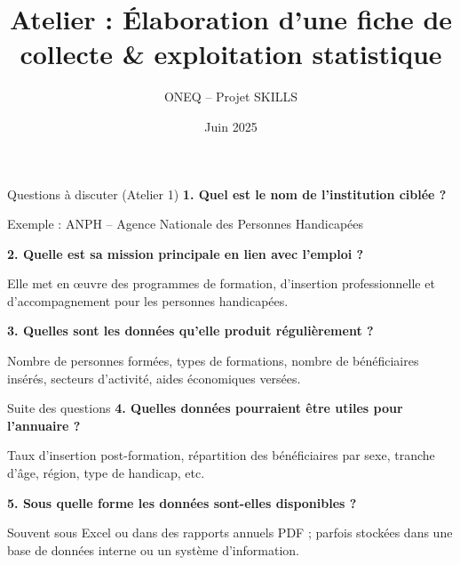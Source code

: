 \documentclass{beamer}
\title{Atelier : Élaboration d'une fiche de collecte \& exploitation statistique}
\author{ONEQ -- Projet SKILLS}
\date{Juin 2025}
\begin{document}
\frame{\titlepage}

\begin{frame}{Questions à discuter (Atelier 1)}
\pause
\textbf{1. Quel est le nom de l’institution ciblée ?}
\begin{tcolorbox}[colback=blue!5!white,colframe=blue!75!black,title=Exemple de réponse]
Exemple : ANPH – Agence Nationale des Personnes Handicapées
\end{tcolorbox}

\pause
\textbf{2. Quelle est sa mission principale en lien avec l’emploi ?}
\begin{tcolorbox}[colback=blue!5!white,colframe=blue!75!black,title=Exemple de réponse]
Elle met en œuvre des programmes de formation, d'insertion professionnelle et d’accompagnement pour les personnes handicapées.
\end{tcolorbox}

\pause
\textbf{3. Quelles sont les données qu’elle produit régulièrement ?}
\begin{tcolorbox}[colback=blue!5!white,colframe=blue!75!black,title=Exemple de réponse]
Nombre de personnes formées, types de formations, nombre de bénéficiaires insérés, secteurs d’activité, aides économiques versées.
\end{tcolorbox}
\end{frame}

\begin{frame}{Suite des questions}
\pause
\textbf{4. Quelles données pourraient être utiles pour l’annuaire ?}
\begin{tcolorbox}[colback=blue!5!white,colframe=blue!75!black,title=Exemple de réponse]
Taux d’insertion post-formation, répartition des bénéficiaires par sexe, tranche d’âge, région, type de handicap, etc.
\end{tcolorbox}

\pause
\textbf{5. Sous quelle forme les données sont-elles disponibles ?}
\begin{tcolorbox}[colback=blue!5!white,colframe=blue!75!black,title=Exemple de réponse]
Souvent sous Excel ou dans des rapports annuels PDF ; parfois stockées dans une base de données interne ou un système d'information.
\end{tcolorbox}
\end{frame}
\end{document}
